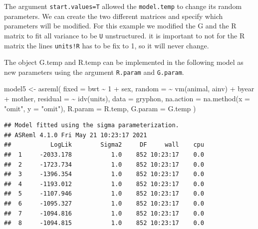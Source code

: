 \documentclass[
  12pt,
]{book}
\newenvironment{Shaded}{\begin{snugshade}}{\end{snugshade}}
\newcommand{\AttributeTok}[1]{\textcolor[rgb]{0.77,0.63,0.00}{#1}}
\newcommand{\DecValTok}[1]{\textcolor[rgb]{0.00,0.00,0.81}{#1}}
\newcommand{\FunctionTok}[1]{\textcolor[rgb]{0.00,0.00,0.00}{#1}}
\newcommand{\NormalTok}[1]{#1}
\newcommand{\OtherTok}[1]{\textcolor[rgb]{0.56,0.35,0.01}{#1}}
\newcommand{\SpecialCharTok}[1]{\textcolor[rgb]{0.00,0.00,0.00}{#1}}
\newcommand{\StringTok}[1]{\textcolor[rgb]{0.31,0.60,0.02}{#1}}
\begin{document}
The argument \texttt{start.values=T} allowed the \texttt{model.temp} to change its random parameters. We can create the two different matrices and specify which parameters will be modified. For this example we modified the G and the R matrix to fit all variance to be \texttt{U} unstructured. it is important to not for the R matrix the lines \texttt{units!R} has to be fix to 1, so it will never change.

The object G.temp and R.temp can be implemented in the following model as new parameters using the argument \texttt{R.param} and \texttt{G.param}.

\begin{Shaded}
\begin{Highlighting}[]
\NormalTok{model5 }\OtherTok{\textless{}{-}} \FunctionTok{asreml}\NormalTok{(}
  \AttributeTok{fixed =}\NormalTok{ bwt }\SpecialCharTok{\textasciitilde{}} \DecValTok{1} \SpecialCharTok{+}\NormalTok{ sex,}
  \AttributeTok{random =} \SpecialCharTok{\textasciitilde{}} \FunctionTok{vm}\NormalTok{(animal, ainv) }\SpecialCharTok{+}\NormalTok{ byear }\SpecialCharTok{+}\NormalTok{ mother,}
  \AttributeTok{residual =} \SpecialCharTok{\textasciitilde{}} \FunctionTok{idv}\NormalTok{(units),}
  \AttributeTok{data =}\NormalTok{ gryphon,}
  \AttributeTok{na.action =} \FunctionTok{na.method}\NormalTok{(}\AttributeTok{x =} \StringTok{"omit"}\NormalTok{, }\AttributeTok{y =} \StringTok{"omit"}\NormalTok{),}
  \AttributeTok{R.param =}\NormalTok{ R.temp, }\AttributeTok{G.param =}\NormalTok{ G.temp}
\NormalTok{)}
\end{Highlighting}
\end{Shaded}

\begin{verbatim}
## Model fitted using the sigma parameterization.
## ASReml 4.1.0 Fri May 21 10:23:17 2021
##           LogLik        Sigma2     DF     wall    cpu
##  1     -2033.178           1.0    852 10:23:17    0.0
##  2     -1723.734           1.0    852 10:23:17    0.0
##  3     -1396.354           1.0    852 10:23:17    0.0
##  4     -1193.012           1.0    852 10:23:17    0.0
##  5     -1107.946           1.0    852 10:23:17    0.0
##  6     -1095.327           1.0    852 10:23:17    0.0
##  7     -1094.816           1.0    852 10:23:17    0.0
##  8     -1094.815           1.0    852 10:23:17    0.0
\end{verbatim}

\begin{Shaded}
\end{Shaded}
\end{document}
